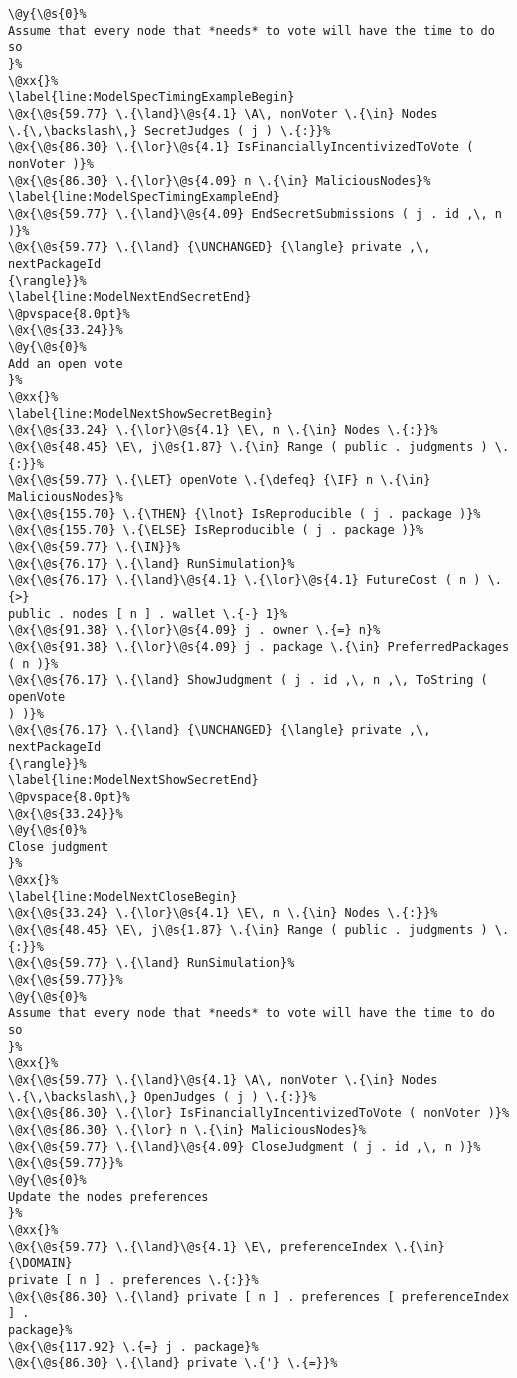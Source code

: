 \begin{lstlisting}[caption=System actor behavior in TLA\textsuperscript+ specification
    , label=lst:ModelSpec]
\@y{\@s{0}%
Assume that every node that *needs* to vote will have the time to do so
}%
\@xx{}%
\label{line:ModelSpecTimingExampleBegin}
\@x{\@s{59.77} \.{\land}\@s{4.1} \A\, nonVoter \.{\in} Nodes
\.{\,\backslash\,} SecretJudges ( j ) \.{:}}%
\@x{\@s{86.30} \.{\lor}\@s{4.1} IsFinanciallyIncentivizedToVote ( nonVoter )}%
\@x{\@s{86.30} \.{\lor}\@s{4.09} n \.{\in} MaliciousNodes}%
\label{line:ModelSpecTimingExampleEnd}
\@x{\@s{59.77} \.{\land}\@s{4.09} EndSecretSubmissions ( j . id ,\, n )}%
\@x{\@s{59.77} \.{\land} {\UNCHANGED} {\langle} private ,\, nextPackageId
{\rangle}}%
\label{line:ModelNextEndSecretEnd}
\@pvspace{8.0pt}%
\@x{\@s{33.24}}%
\@y{\@s{0}%
Add an open vote
}%
\@xx{}%
\label{line:ModelNextShowSecretBegin}
\@x{\@s{33.24} \.{\lor}\@s{4.1} \E\, n \.{\in} Nodes \.{:}}%
\@x{\@s{48.45} \E\, j\@s{1.87} \.{\in} Range ( public . judgments ) \.{:}}%
\@x{\@s{59.77} \.{\LET} openVote \.{\defeq} {\IF} n \.{\in} MaliciousNodes}%
\@x{\@s{155.70} \.{\THEN} {\lnot} IsReproducible ( j . package )}%
\@x{\@s{155.70} \.{\ELSE} IsReproducible ( j . package )}%
\@x{\@s{59.77} \.{\IN}}%
\@x{\@s{76.17} \.{\land} RunSimulation}%
\@x{\@s{76.17} \.{\land}\@s{4.1} \.{\lor}\@s{4.1} FutureCost ( n ) \.{>}
public . nodes [ n ] . wallet \.{-} 1}%
\@x{\@s{91.38} \.{\lor}\@s{4.09} j . owner \.{=} n}%
\@x{\@s{91.38} \.{\lor}\@s{4.09} j . package \.{\in} PreferredPackages ( n )}%
\@x{\@s{76.17} \.{\land} ShowJudgment ( j . id ,\, n ,\, ToString ( openVote
) )}%
\@x{\@s{76.17} \.{\land} {\UNCHANGED} {\langle} private ,\, nextPackageId
{\rangle}}%
\label{line:ModelNextShowSecretEnd}
\@pvspace{8.0pt}%
\@x{\@s{33.24}}%
\@y{\@s{0}%
Close judgment
}%
\@xx{}%
\label{line:ModelNextCloseBegin}
\@x{\@s{33.24} \.{\lor}\@s{4.1} \E\, n \.{\in} Nodes \.{:}}%
\@x{\@s{48.45} \E\, j\@s{1.87} \.{\in} Range ( public . judgments ) \.{:}}%
\@x{\@s{59.77} \.{\land} RunSimulation}%
\@x{\@s{59.77}}%
\@y{\@s{0}%
Assume that every node that *needs* to vote will have the time to do so
}%
\@xx{}%
\@x{\@s{59.77} \.{\land}\@s{4.1} \A\, nonVoter \.{\in} Nodes
\.{\,\backslash\,} OpenJudges ( j ) \.{:}}%
\@x{\@s{86.30} \.{\lor} IsFinanciallyIncentivizedToVote ( nonVoter )}%
\@x{\@s{86.30} \.{\lor} n \.{\in} MaliciousNodes}%
\@x{\@s{59.77} \.{\land}\@s{4.09} CloseJudgment ( j . id ,\, n )}%
\@x{\@s{59.77}}%
\@y{\@s{0}%
Update the nodes preferences
}%
\@xx{}%
\@x{\@s{59.77} \.{\land}\@s{4.1} \E\, preferenceIndex \.{\in} {\DOMAIN}
private [ n ] . preferences \.{:}}%
\@x{\@s{86.30} \.{\land} private [ n ] . preferences [ preferenceIndex ] .
package}%
\@x{\@s{117.92} \.{=} j . package}%
\@x{\@s{86.30} \.{\land} private \.{'} \.{=}}%

\end{lstlisting}
